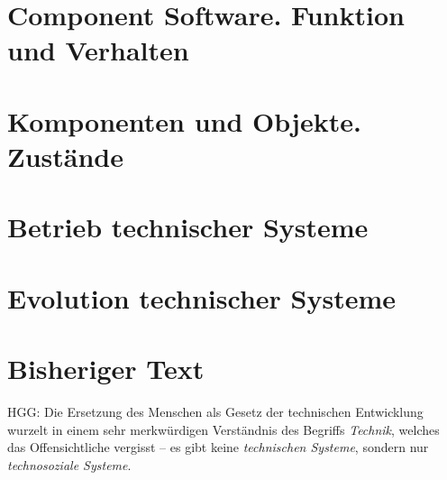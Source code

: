 \documentclass[11pt,a4paper]{article}
\begin{document}
\section{Component Software. Funktion und Verhalten}
\section{Komponenten und Objekte. Zustände}
\section{Betrieb technischer Systeme}
\section{Evolution technischer Systeme}
\section{Bisheriger Text}

HGG: Die Ersetzung des Menschen als Gesetz der technischen Entwicklung wurzelt
in einem sehr merkwürdigen Verständnis des Begriffs \emph{Technik}, welches
das Offensichtliche vergisst -- es gibt keine \emph{technischen Systeme},
sondern nur \emph{technosoziale Systeme}.
\end{document}
